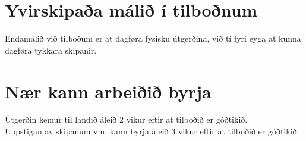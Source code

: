 

\usepackage{expl3}
\usepackage{xparse}

\def \overskrift	{Tilboð uppá nýggjan ambætara}			%
\def \CompanyName	{Litaval} %
\def \companyName	{\CompanyName}
\def \dealExpire 	{3. Okt. 2016}  %
\ExplSyntaxOn
{}
\ExplSyntaxOff



\def \ServerFragt	{1500}
\def \ServerPris	{29000}
\def \ServerNavn	{2U Rack}
\def \ServersWin	{3}
\def \ServersHV		{1}
\def \APPCount		{4} %
\def \LeasingLoebetid	{36}	%
\def \LicenseWinPrice{5025}
\def \LicenseWin	{2}			%

\def \antalBrugere	{15}		%
\def \ServerCALPack	{\roundnearfive{\antalBrugere}}
\def \antalGBcopy	{300}
\def \antalKlienter	{10}
\def \RBackupGB		{350}		%
\def \RBackupPris	{3.5}			%

\def \arbejdsTimer	{44}

\def \SYNACK		{\textit{(Synack)}} 
\def \SYNACKNP		{Synack }






\author{Heðin Ejdesgaard Møller}
\vspace*{-20mm}
\begin{center}

    \thispagestyle{SYNACKSALEFOOTER}
    \vspace*{25mm}
    \tableofcontents
    \vfill
    \newpage
\end{center}
\section{Yvirskipaða málið í tilboðnum}
Endamálið við tilboðum er at dagføra fysisku útgerðina, við tí fyri eyga at kunna dagføra tykkara skipanir.

\section{Nær kann arbeiðið byrja}
Útgerðin kemur til landið áleið 2 vikur eftir at tilboðið er góðtikið. \\ 
Uppstigan av skipanum vm. kann byrja áleið 3 vikur eftir at tilboðið er góðtikið. \\

